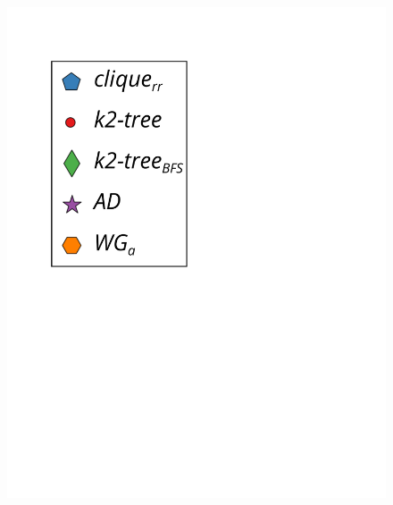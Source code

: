 \begin{figure}
\begin{minipage}{1\textwidth}
\begin{minipage}{0.45\textwidth}
\begin{minipage}{0.2\textwidth}
    				\includegraphics[scale=.2, clip, trim=60 194 0 0]{img/bpeTimes/labelAle.pdf}
    			\end{minipage}
    			

\end{minipage}
\end{minipage}
\end{figure}
